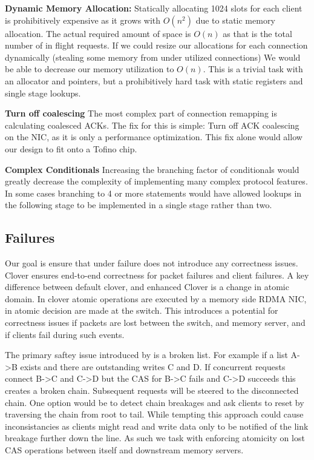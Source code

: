 \textbf{Dynamic Memory Allocation:}
Statically allocating 1024 slots for each client is prohibitively expensive as
it grows with $O(n^2)$ due to static memory allocation. The actual required
amount of space is $O(n)$ as that is the total number of in flight requests. If
we could resize our allocations for each connection dynamically (stealing some
memory from under utilized connections) We would be able to decrease our memory
utilization to $O(n)$. This is a trivial task with an allocator and pointers, but
a prohibitively hard task with static registers and single stage lookups.

\textbf{Turn off coalescing} The most complex part of connection remapping is
calculating coalesced ACKs. The fix for this is simple: Turn off ACK coalescing
on the NIC, as it is only a performance optimization. This fix alone would allow
our design to fit onto a Tofino chip.

\textbf{Complex Conditionals} Increasing the branching factor of conditionals
would greatly decrease the complexity of implementing many complex protocol
features. In some cases branching to 4 or more statements would have allowed
lookups in the following stage to be implemented in a single stage rather than
two.

\subsection{Failures}

Our goal is ensure that under failure \sword does not introduce any correctness
issues. Clover ensures end-to-end correctness for packet failures and client
failures. A key difference between default clover, and \sword enhanced Clover is
a change in atomic domain. In clover atomic operations are executed by a memory
side RDMA NIC, in \sword atomic decision are made at the switch. This
introduces a potential for correctness issues if packets are lost between the
switch, and memory server, and if clients fail during such events.

The primary saftey issue introduced by \sword is a broken list. For example if a
list A->B exists and there are outstanding writes C and D. If concurrent
requests connect B->C and C->D but the CAS for B->C fails and C->D succeeds this
creates a broken chain. Subsequent requests will be steered to the disconnected
chain. One option would be to detect chain breakages and ask clients to reset by
traversing the chain from root to tail. While tempting this approach could cause
inconsistancies as clients might read and write data only to be notified of the
link breakage further down the line. As such we task \sword with enforcing
atomicity on lost CAS operations between itself and downstream memory servers.

